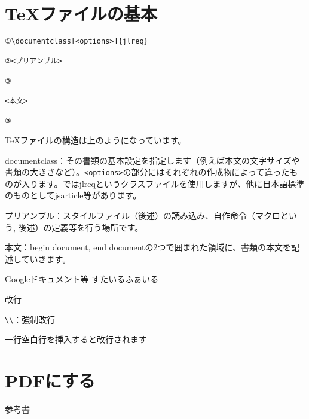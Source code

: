 \begin{multicols*}{2}
\section{\TeX ファイルの基本}
\begin{verbatim}
①\documentclass[<options>]{jlreq}

②<プリアンブル>

③
    
<本文>

③
\end{verbatim}
\vspace{1\zw}
\TeX ファイルの構造は上のようになっています。
\begin{enumcircle}
    \item documentclass：その書類の基本設定を指定します（例えば本文の文字サイズや書類の大きさなど）。\verb|<options>|の部分にはそれぞれの作成物によって違ったものが入ります。\BunTeX ではjlreqというクラスファイルを使用しますが、他に日本語標準のものとしてjsarticle等があります。
    \item プリアンブル：スタイルファイル（後述）の読み込み、自作命令（マクロという, 後述）の定義等を行う場所です。
    \item 本文：begin document, end documentの2つで囲まれた領域に、書類の本文を記述していきます。
\end{enumcircle}

Googleドキュメント等
すたいるふぁいる
\begin{framebox-simple}{改行}
    \begin{reitemize}
        \item \verb|\\|：強制改行
        \item 一行空白行を挿入すると改行されます
    \end{reitemize}
\end{framebox-simple}

\section{PDFにする}

参考書
\end{multicols*}